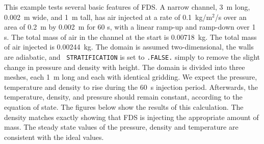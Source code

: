 \documentclass[11pt]{book}
\newcommand{\ct}{\tt\small}
\begin{document}
This example tests several basic features of FDS. A narrow channel, 3~m long, 0.002~m wide, and 1~m tall, has air injected at a rate of
0.1~kg/m$^2$/s over an area of 0.2~m by 0.002~m for 60 s, with a linear ramp-up and ramp-down over 1 s. The total mass of air in the channel at the
start is 0.00718~kg. The total mass of air injected is 0.00244~kg. The domain is assumed two-dimensional, the walls are adiabatic, and {\ct
STRATIFICATION} is set to {\ct .FALSE.} simply to remove the slight change in pressure and density with height.
The domain is divided into three meshes, each 1~m long and each with identical gridding.  We expect the pressure,
temperature and density to rise during the 60~s injection period. Afterwards, the
temperature, density, and pressure should remain constant, according to the equation of state.
The figures below show the results of this calculation.  The density matches exactly showing
that FDS is injecting the appropriate amount of mass. The steady state values of the pressure, density and temperature are consistent with
the ideal values.
\end{document}
